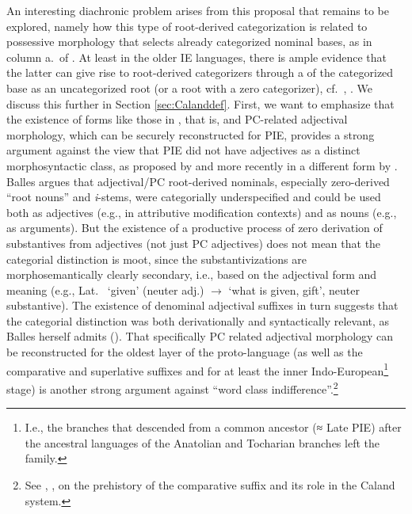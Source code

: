 \documentclass[output=paper,colorlinks,citecolor=brown]{langscibook}
\begin{document}
 
An interesting diachronic problem  arises from this proposal that  remains to be explored, namely how this type of root-derived  categorization is related to possessive morphology that selects already categorized nominal bases, as in column a.\ of . At least in the older IE languages, there is ample evidence that the latter can give rise to root-derived  categorizers through a  of the categorized base as an uncategorized root (or a root with a zero categorizer), cf.\  \citet{Grestenberger2020, Grestenberger2021}, \citet{GrestenbergeretalICHL}. We discuss this further in Section \ref{sec:Calanddef}. First, we want to emphasize that the existence of forms like those in , that is,  and PC-related adjectival morphology, which can be securely reconstructed for PIE, provides a strong argument against the view that PIE did not have adjectives as a distinct morphosyntactic class, as proposed by \citet{Balles2006} and more recently in a different form by \citet{Alfieri2016}. Balles argues that adjectival/PC root-derived nominals, especially zero-derived ``root nouns'' and \textit{i}-stems, were categorially underspecified and could be used both as adjectives (e.g., in attributive modification contexts) and as nouns (e.g., as arguments). But the existence of a productive process of zero derivation of substantives from adjectives (not just PC adjectives) does not mean that the categorial distinction is moot, since the substantivizations are morphosemantically clearly secondary, i.e., based on the adjectival form and meaning (e.g., Lat.\  `given' (neuter adj.) $\rightarrow$ `what is given, gift', neuter substantive). The existence of denominal   adjectival suffixes in turn suggests that the categorial distinction was both derivationally and syntactically relevant, as Balles herself admits (\citeyear[286]{Balles2006}). That specifically PC related adjectival morphology can be reconstructed for the oldest layer of the proto-language (as well as the comparative and superlative suffixes  and  for at least the inner Indo-European\footnote{I.e., the branches  that descended from a common ancestor (≈ Late PIE) after the ancestral languages of the Anatolian and Tocharian branches left the family.} stage)  is another strong argument against ``word class indifference''.\footnote{See \citealt{MeierBrügger2014}, \citealt{Rau2014}, \citealt{Pinault2018} on the prehistory of the comparative suffix and its role in the Caland system.} 
\end{document}
